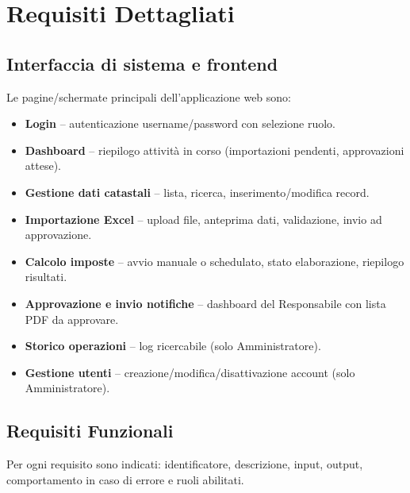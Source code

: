 \documentclass[12pt, a4paper]{article}
\begin{document}
\section{Requisiti Dettagliati}

\subsection{Interfaccia di sistema e frontend}

Le pagine/schermate principali dell'applicazione web sono:

\begin{itemize}
  \item \textbf{Login} -- autenticazione username/password con selezione ruolo.
  \item \textbf{Dashboard} -- riepilogo attività in corso (importazioni pendenti, approvazioni attese).
  \item \textbf{Gestione dati catastali} -- lista, ricerca, inserimento/modifica record.
  \item \textbf{Importazione Excel} -- upload file, anteprima dati, validazione, invio ad approvazione.
  \item \textbf{Calcolo imposte} -- avvio manuale o schedulato, stato elaborazione, riepilogo risultati.
  \item \textbf{Approvazione e invio notifiche} -- dashboard del Responsabile con lista PDF da approvare.
  \item \textbf{Storico operazioni} -- log ricercabile (solo Amministratore).
  \item \textbf{Gestione utenti} -- creazione/modifica/disattivazione account (solo Amministratore).
\end{itemize}

\subsection{Requisiti Funzionali}

Per ogni requisito sono indicati: identificatore, descrizione, input, output, comportamento
in caso di errore e ruoli abilitati.

\end{document}
